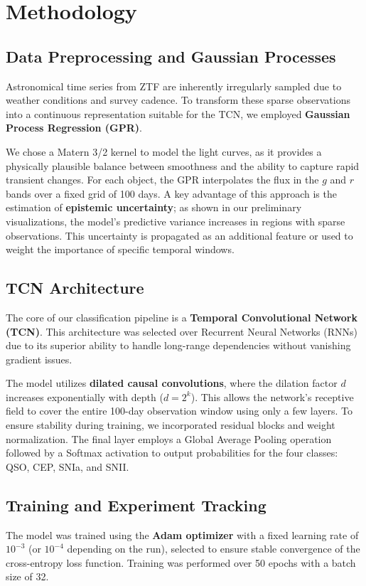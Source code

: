 \documentclass[twocolumn, 10pt]{article} %
\begin{document}
\section{Methodology}

\subsection{Data Preprocessing and Gaussian Processes}
Astronomical time series from ZTF are inherently irregularly sampled due to weather conditions and survey cadence. To transform these sparse observations into a continuous representation suitable for the TCN, we employed \textbf{Gaussian Process Regression (GPR)}. 

We chose a Matern 3/2 kernel to model the light curves, as it provides a physically plausible balance between smoothness and the ability to capture rapid transient changes. For each object, the GPR interpolates the flux in the $g$ and $r$ bands over a fixed grid of 100 days. A key advantage of this approach is the estimation of \textbf{epistemic uncertainty}; as shown in our preliminary visualizations, the model's predictive variance increases in regions with sparse observations. This uncertainty is propagated as an additional feature or used to weight the importance of specific temporal windows.

\subsection{TCN Architecture}
The core of our classification pipeline is a \textbf{Temporal Convolutional Network (TCN)}. This architecture was selected over Recurrent Neural Networks (RNNs) due to its superior ability to handle long-range dependencies without vanishing gradient issues. 

The model utilizes \textbf{dilated causal convolutions}, where the dilation factor $d$ increases exponentially with depth ($d = 2^k$). This allows the network's receptive field to cover the entire 100-day observation window using only a few layers. To ensure stability during training, we incorporated residual blocks and weight normalization. The final layer employs a Global Average Pooling operation followed by a Softmax activation to output probabilities for the four classes: QSO, CEP, SNIa, and SNII.

\subsection{Training and Experiment Tracking}
The model was trained using the \textbf{Adam optimizer} with a fixed learning rate of $10^{-3}$ (or $10^{-4}$ depending on the run), selected to ensure stable convergence of the cross-entropy loss function. Training was performed over 50 epochs with a batch size of 32.
\end{document}
